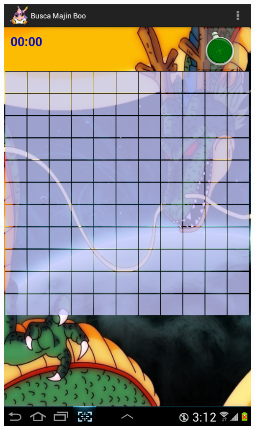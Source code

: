 \documentclass[11pt]{article} %
\begin{document}
\begin{itemize}
\begin{center}
\includegraphics[scale=0.2]{Imagenes/SSHard.png}
\end{center}
\end {itemize}
\end{document}
